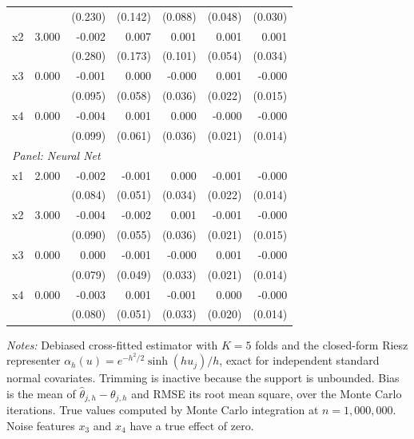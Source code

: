 \documentclass[12pt]{article}
\begin{document}
\begin{table}[htbp]
\begin{threeparttable}
\begin{tabular}{lrrrrrr}
				&  & (0.230) & (0.142) & (0.088) & (0.048) & (0.030) \\
				\quad x2 & 3.000 & -0.002 & 0.007 & 0.001 & 0.001 & 0.001 \\
				&  & (0.280) & (0.173) & (0.101) & (0.054) & (0.034) \\
				\quad x3 & 0.000 & -0.001 & 0.000 & -0.000 & 0.001 & -0.000 \\
				&  & (0.095) & (0.058) & (0.036) & (0.022) & (0.015) \\
				\quad x4 & 0.000 & -0.004 & 0.001 & 0.000 & -0.000 & -0.000 \\
				&  & (0.099) & (0.061) & (0.036) & (0.021) & (0.014) \\
				\midrule
				\multicolumn{7}{l}{\textit{Panel: Neural Net}} \\
				\quad x1 & 2.000 & -0.002 & -0.001 & 0.000 & -0.001 & -0.000 \\
				&  & (0.084) & (0.051) & (0.034) & (0.022) & (0.014) \\
				\quad x2 & 3.000 & -0.004 & -0.002 & 0.001 & -0.001 & -0.000 \\
				&  & (0.090) & (0.055) & (0.036) & (0.021) & (0.015) \\
				\quad x3 & 0.000 & 0.000 & -0.001 & -0.000 & 0.001 & -0.000 \\
				&  & (0.079) & (0.049) & (0.033) & (0.021) & (0.014) \\
				\quad x4 & 0.000 & -0.003 & 0.001 & -0.001 & 0.000 & -0.000 \\
				&  & (0.080) & (0.051) & (0.033) & (0.020) & (0.014) \\
				\bottomrule
				\end{tabular}
				\begin{tablenotes}
				\footnotesize
				\item \textit{Notes:} Debiased cross-fitted estimator with $K=5$ folds and the closed-form Riesz representer $\alpha_h(u) = e^{-h^2/2}\sinh(h u_j)/h$, exact for independent standard normal covariates. Trimming is inactive because the support is unbounded. Bias is the mean of $\hat{\theta}_{j,h} - \theta_{j,h}$ and RMSE its root mean square, over the Monte Carlo iterations. True values computed by Monte Carlo integration at $n=1{,}000{,}000$. Noise features $x_3$ and $x_4$ have a true effect of zero.
				\end{tablenotes}
		\end{threeparttable}
	\end{table}
	
\end{document}
